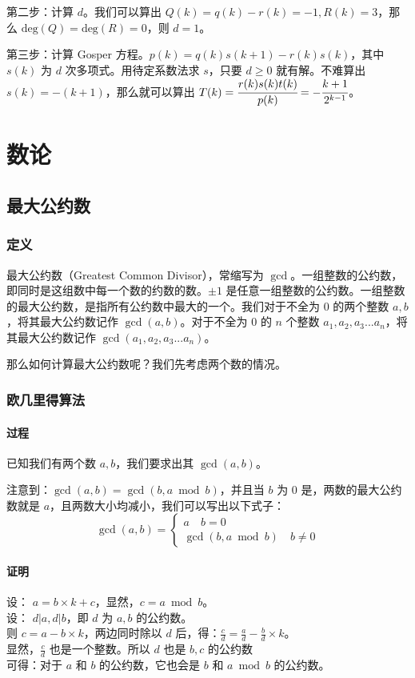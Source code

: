 \documentclass[10pt,twoside,a4paper,UTF8]{ctexbook}
\begin{document}
	第二步：计算 $d$。我们可以算出 $Q(k) = q(k)-r(k)=-1, R(k) = 3$，那么 $\text{deg}(Q) = \text{deg}(R) = 0$，则 $d = 1$。
	
	第三步：计算 Gosper 方程。$p(k) = q(k)s(k+1)-r(k)s(k)$，其中 $s(k)$ 为 $d$ 次多项式。用待定系数法求 $s$，只要 $d \ge 0$ 就有解。不难算出 $s(k) = -(k+1)$，那么就可以算出 $T(k)=\cfrac{r(k)s(k)t(k)}{p(k)}=-\cfrac{k+1}{2^{k-1}}$。
	
	
	
	\chapter{数论}
	\section{最大公约数}
	\subsection{定义}
	最大公约数（Greatest Common Divisor），常缩写为 $\gcd$。一组整数的公约数，即同时是这组数中每一个数的约数的数。$\pm 1$ 是任意一组整数的公约数。一组整数的最大公约数，是指所有公约数中最大的一个。我们对于不全为 $0$ 的两个整数 $a,b$，将其最大公约数记作 $\gcd(a,b)$。对于不全为 $0$ 的 $n$ 个整数 $a_1,a_2,a_3 ... a_n$，将其最大公约数记作 $\gcd(a_1,a_2,a_3...a_n)$。\par
	那么如何计算最大公约数呢？我们先考虑两个数的情况。
	\subsection{欧几里得算法}
	\subsubsection{过程}
	已知我们有两个数 $a,b$，我们要求出其 $\gcd(a,b)$。
	
	注意到：$\gcd(a,b) = \gcd(b,a \bmod b)$，并且当 $b$ 为 $0$ 是，两数的最大公约数就是 $a$，且两数大小均减小，我们可以写出以下式子：\\
	\begin{equation}
	\gcd(a,b) =\left\{
		\begin{aligned}
			a \quad b = 0\\
			\gcd(b,a \bmod b) \quad b\not= 0
		\end{aligned}
		\right
		.\label{gcd_mod}
	\end{equation}
	\subsubsection{证明}
	\noindent
	设： $a = b \times k + c$，显然，$c = a \bmod b$。\\
	设： $d | a,d | b$，即 $d$ 为 $a,b$ 的公约数。\\
	则 $c = a - b \times k$，两边同时除以 $d$ 后，得：$\frac{c}{d} = \frac{a}{d} - \frac{b}{d} \times k$。\\
	显然，$\frac{c}{d}$ 也是一个整数。所以 $d$ 也是 $b,c$ 的公约数\\
	可得：对于 $a$ 和 $b$ 的公约数，它也会是 $b$ 和 $a \bmod b$ 的公约数。\\
	
\end{document}
